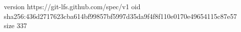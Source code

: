 version https://git-lfs.github.com/spec/v1
oid sha256:436d2717623cba614bf99857bf5997d35da9f4f8f110e0170e49654115c87e57
size 337
